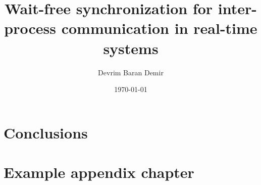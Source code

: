 \documentclass[ a4paper,
                oneside,
                toc=bibliography,
                toc=listof
                ]{scrbook}
\author{Devrim Baran Demir}
\title{Wait-free synchronization for inter-process communication in real-time systems}
\date{\today}
\begin{document}
 
    \frontmatter
    \makeISWtitle

	\cleardoublepage
	\setcounter{page}{1} %
    \declarationOfOriginality

    
    
    \cleardoublepage
    \tableofcontents
       

    \mainmatter
    


    
    
    
    
    
    \chapter{Conclusions}

    
    \cleardoublepage
    \printbibliography
    
     \cleardoublepage
    
    
    \cleardoublepage
    \listoffigures
    
    \cleardoublepage
    \listoftables
    
    
    
    \appendix
    \chapter{Example appendix chapter}
\end{document}
